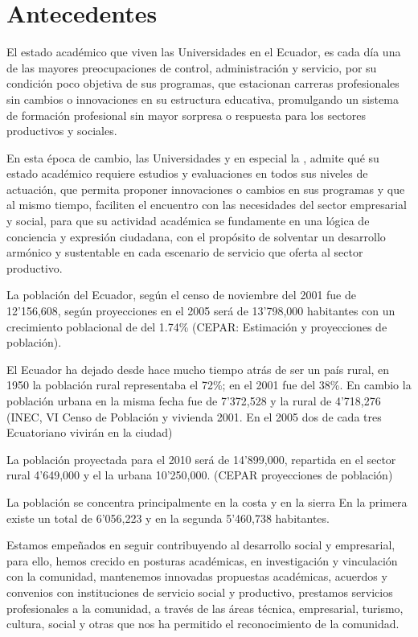 \section{Antecedentes}
El estado académico que viven las Universidades en el Ecuador, es cada día  una de las mayores preocupaciones de control, 
administración y servicio, por su condición poco objetiva de sus programas, que estacionan carreras profesionales 
sin cambios o innovaciones  en su estructura educativa, promulgando un sistema de formación profesional sin 
mayor sorpresa o  respuesta para los  sectores productivos y sociales.

En esta época de cambio, las Universidades y en especial la \University, admite 
qué  su estado  académico requiere estudios y evaluaciones en todos sus niveles de actuación,  
que permita proponer   innovaciones  o cambios  en sus programas y que al mismo tiempo, 
faciliten el encuentro con las necesidades del sector empresarial y social, 
para que su actividad académica se fundamente en una lógica de conciencia y 
expresión ciudadana, con el propósito de solventar un desarrollo armónico y 
sustentable en cada escenario de servicio que  oferta al sector productivo. 

La población del Ecuador, según el censo de noviembre del 2001 fue de 12'156,608, 
según proyecciones en el 2005 será de 13'798,000 habitantes con un crecimiento 
poblacional de  del 1.74\% (CEPAR: Estimación  y proyecciones de población).

El Ecuador ha dejado desde hace mucho tiempo atrás de ser un país rural, 
en 1950 la población rural representaba el 72\%; en el 2001 fue del 38\%. 
En cambio la población urbana en la misma fecha fue de 7'372,528 y la rural de 
4'718,276 (INEC, VI Censo  de  Población  y vivienda 2001. En el 2005 dos de 
cada tres Ecuatoriano vivirán en la ciudad)

La población proyectada para el 2010 será de 14'899,000, repartida en el 
sector rural 4'649,000 y el la urbana 10'250,000. (CEPAR  proyecciones de población)

La población se concentra principalmente en la costa y en la sierra En la
primera existe un total de 6'056,223  y en la segunda 5'460,738 habitantes.



Estamos empeñados en seguir contribuyendo al desarrollo social y empresarial, 
para ello, hemos crecido en posturas académicas, en investigación y vinculación 
con la comunidad, mantenemos innovadas propuestas académicas, acuerdos y convenios 
con instituciones de servicio social y productivo, prestamos servicios 
profesionales a la comunidad, a través de las áreas técnica, empresarial, 
turismo, cultura, social y otras  que nos ha permitido el reconocimiento de la comunidad.

